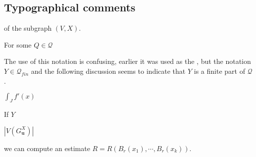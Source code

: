 \documentclass[12pt]{article}
\begin{document}
\subsection*{Typographical comments}

\begin{itemize}
 of the subgraph $(V, X)$.

 For some $Q \in \mathcal Q$

 The use of this notation is confusing, earlier it was used as the , but the notation $Y\in \mathcal Q_{fin}$ and the following discussion seems to indicate that $Y$ is a finite part of $\mathcal Q$.

 $\int_J f'(x)$


 If $Y$

 $|V(G_{\mathbf{u}}^X)|$

 we can compute an estimate $R = R(B_r(x_1), \cdots , B_r(x_k))$.

\end{itemize}




\end{document}
